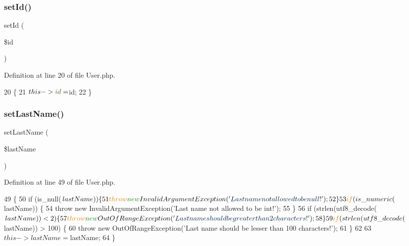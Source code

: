\subsubsection{\texorpdfstring{set\+Id()}{setId()}}
{\footnotesize\ttfamily set\+Id (\begin{DoxyParamCaption}\item[{}]{\$id }\end{DoxyParamCaption})}



Definition at line 20 of file User.\+php.


\begin{DoxyCode}
20                               \{
21         $this->\textcolor{keywordtype}{id} = $id;
22     \}
\end{DoxyCode}
\hypertarget{class_user_a90ee65f53f523c6ec0abb74c014c3e2a}{}\label{class_user_a90ee65f53f523c6ec0abb74c014c3e2a} 
\subsubsection{\texorpdfstring{set\+Last\+Name()}{setLastName()}}
{\footnotesize\ttfamily set\+Last\+Name (\begin{DoxyParamCaption}\item[{}]{\$last\+Name }\end{DoxyParamCaption})}



Definition at line 49 of file User.\+php.


\begin{DoxyCode}
49                                           \{
50         \textcolor{keywordflow}{if} (is\_null($lastName)) \{
51             \textcolor{keywordflow}{throw} \textcolor{keyword}{new} InvalidArgumentException(\textcolor{stringliteral}{'Last name not allowed to be null!'});
52         \}
53         \textcolor{keywordflow}{if} (is\_numeric($lastName)) \{
54             \textcolor{keywordflow}{throw} \textcolor{keyword}{new} InvalidArgumentException(\textcolor{stringliteral}{'Last name not allowed to be int!'});
55         \}
56         \textcolor{keywordflow}{if} (strlen(utf8\_decode($lastName)) < 2) \{
57             \textcolor{keywordflow}{throw} \textcolor{keyword}{new} OutOfRangeException(\textcolor{stringliteral}{'Last name should be greater than 2 characters!'});
58         \}
59         \textcolor{keywordflow}{if} (strlen(utf8\_decode($lastName)) > 100) \{
60             \textcolor{keywordflow}{throw} \textcolor{keyword}{new} OutOfRangeException(\textcolor{stringliteral}{'Last name should be lesser than 100 characters!'});
61         \}
62 
63         $this->lastName = $lastName;
64     \}
\end{DoxyCode}
\hypertarget{class_user_a8d1b74eee01080bc0040c74d1ff250e9}{}\label{class_user_a8d1b74eee01080bc0040c74d1ff250e9} 
